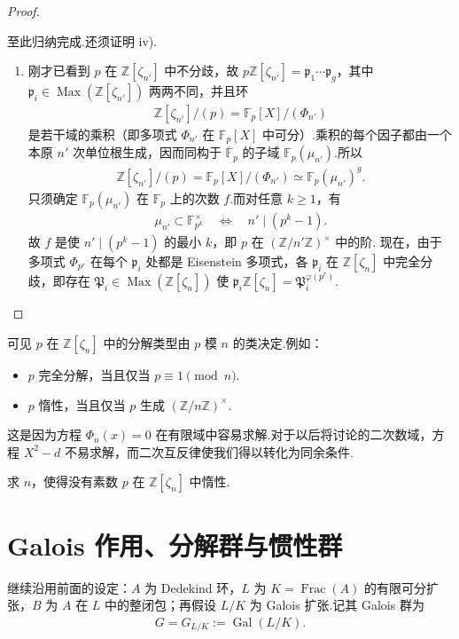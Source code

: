 \begin{proof}
\begin{enumerate}[label=\roman*)]
\end{enumerate}
至此归纳完成.还须证明 iv).
\begin{enumerate}[label=\roman*),start=4]
\item 刚才已看到 $p$ 在 $\mathbb Z[\zeta_{n'}]$ 中不分歧，故 $p\mathbb Z[\zeta_{n'}]=\mathfrak p_1\cdots\mathfrak p_g$，其中 $\mathfrak p_i\in\operatorname{Max}(\mathbb Z[\zeta_{n'}])$ 两两不同，并且环
\begin{align*}
\mathbb Z[\zeta_{n'}]/(p)=\mathbb F_p[X]/(\Phi_{n'})
\end{align*}
是若干域的乘积（即多项式 $\Phi_{n'}$ 在 $\mathbb F_p[X]$ 中可分）.乘积的每个因子都由一个本原 $n'$ 次单位根生成，因而同构于 $\overline{\mathbb F}_p$ 的子域 $\mathbb F_p(\mu_{n'})$.所以
\begin{align*}
\mathbb Z[\zeta_{n'}]/(p)=\mathbb F_p[X]/(\Phi_{n'})\simeq\mathbb F_p(\mu_{n'})^g.
\end{align*}
只须确定 $\mathbb F_p(\mu_{n'})$ 在 $\mathbb F_p$ 上的次数 $f$.而对任意 $k\ge1$，有
\begin{align*}
\mu_{n'}\subset\mathbb F_{p^k}^\times\quad\Longleftrightarrow\quad n'\mid(p^k-1).
\end{align*}
故 $f$ 是使 $n'\mid(p^k-1)$ 的最小 $k$，即 $p$ 在 $(\mathbb Z/n'\mathbb Z)^\times$ 中的阶.
现在，由于多项式 $\Phi_{p^r}$ 在每个 $\mathfrak p_i$ 处都是 Eisenstein 多项式，各 $\mathfrak p_i$ 在 $\mathbb Z[\zeta_n]$ 中完全分歧，即存在 $\mathfrak P_i\in\operatorname{Max}(\mathbb Z[\zeta_n])$ 使 $\mathfrak p_i\mathbb Z[\zeta_n]=\mathfrak P_i^{\varphi(p^r)}$.\qedhere
\end{enumerate}
\end{proof}
\begin{remark*}
可见 $p$ 在 $\mathbb Z[\zeta_n]$ 中的分解类型由 $p$ 模 $n$ 的类决定.例如：
\begin{itemize}
\item $p$ 完全分解，当且仅当 $p\equiv1\pmod n$.
\item $p$ 惰性，当且仅当 $p$ 生成 $(\mathbb Z/n\mathbb Z)^\times$.
\end{itemize}
这是因为方程 $\Phi_n(x)=0$ 在有限域中容易求解.对于以后将讨论的二次数域，方程 $X^2-d$ 不易求解，而二次互反律使我们得以转化为同余条件.
\end{remark*}
\begin{exercise*}
求 $n$，使得没有素数 $p$ 在 $\mathbb Z[\zeta_n]$ 中惰性.
\end{exercise*}

\section{Galois 作用、分解群与惯性群}\label{sec:nt-3-5}
继续沿用前面的设定：$A$ 为 Dedekind 环，$L$ 为 $K=\operatorname{Frac}(A)$ 的有限可分扩张，$B$ 为 $A$ 在 $L$ 中的整闭包；再假设 $L/K$ 为 Galois 扩张.记其 Galois 群为
\begin{align*}
G=G_{L/K}:=\operatorname{Gal}(L/K).
\end{align*}

